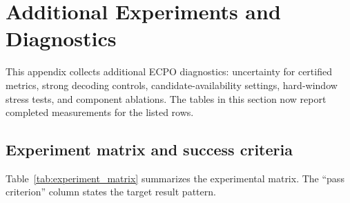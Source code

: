 \documentclass{article}
\begin{document}
\section{Additional Experiments and Diagnostics}
\label{sec:app_additional_experiments}

This appendix collects additional ECPO diagnostics: uncertainty for certified metrics, strong decoding controls, candidate-availability settings, hard-window stress tests, and component ablations. The tables in this section now report completed measurements for the listed rows.

\subsection{Experiment matrix and success criteria}
\label{sec:app_experiment_matrix}
Table~\ref{tab:experiment_matrix} summarizes the experimental matrix. The ``pass criterion'' column states the target result pattern.
\end{document}

